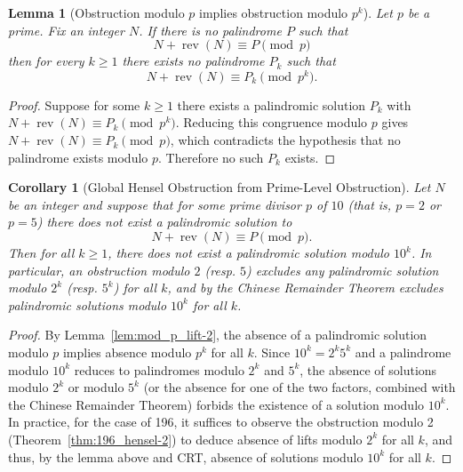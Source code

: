 \documentclass[12pt,a4paper]{article}
\newtheorem{lemma}[theorem]{Lemma}
\newtheorem{corollary}[theorem]{Corollary}
\begin{document}
\begin{lemma}[Obstruction modulo $p$ implies obstruction modulo $p^k$]
Let $p$ be a prime. Fix an integer $N$. If there is no palindrome $P$ such that
$$N+\operatorname{rev}(N)\equiv P\pmod p$$
then for every $k\ge1$ there exists no palindrome $P_k$ such that
$$N+\operatorname{rev}(N)\equiv P_k\pmod{p^k}.$$
\end{lemma}

\begin{proof}
Suppose for some $k\ge1$ there exists a palindromic solution $P_k$ with
$N+\operatorname{rev}(N)\equiv P_k\pmod{p^k}$. Reducing this congruence modulo $p$ gives
$N+\operatorname{rev}(N)\equiv P_k\pmod p$, which contradicts the hypothesis that no palindrome exists modulo $p$. Therefore no such $P_k$ exists.
\end{proof}

\begin{corollary}[Global Hensel Obstruction from Prime-Level Obstruction]\label{cor:prime_to_power-8}
Let $N$ be an integer and suppose that for some prime divisor $p$ of $10$ (that is, $p=2$ or $p=5$) there does not exist a palindromic solution to
\[
N+\operatorname{rev}(N)\equiv P\pmod p.
\]
Then for all $k \ge 1$, there does not exist a palindromic solution modulo $10^k$. In particular, an obstruction modulo $2$ (resp. $5$) excludes any palindromic solution modulo $2^k$ (resp. $5^k$) for all $k$, and by the Chinese Remainder Theorem excludes palindromic solutions modulo $10^k$ for all $k$.
\end{corollary}

\begin{proof}
By Lemma~\ref{lem:mod_p_lift-2}, the absence of a palindromic solution modulo $p$ implies absence modulo $p^k$ for all $k$. Since $10^k=2^k5^k$ and a palindrome modulo $10^k$ reduces to palindromes modulo $2^k$ and $5^k$, the absence of solutions modulo $2^k$ or modulo $5^k$ (or the absence for one of the two factors, combined with the Chinese Remainder Theorem) forbids the existence of a solution modulo $10^k$. In practice, for the case of 196, it suffices to observe the obstruction modulo 2 (Theorem~\ref{thm:196_hensel-2}) to deduce absence of lifts modulo $2^k$ for all $k$, and thus, by the lemma above and CRT, absence of solutions modulo $10^k$ for all $k$.
\end{proof}
\end{document}
